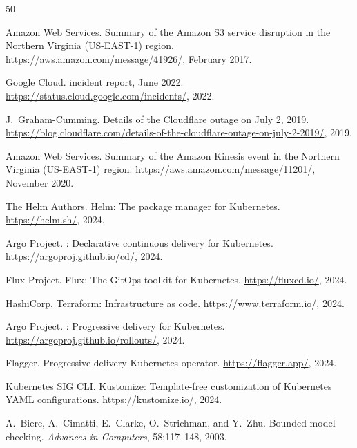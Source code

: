 \documentclass[10pt,twocolumn]{article}
\begin{document}
\begin{thebibliography}{50}

Amazon Web Services.
\newblock Summary of the {Amazon S3} service disruption in the {Northern Virginia (US-EAST-1)} region.
\newblock \url{https://aws.amazon.com/message/41926/}, February 2017.

Google Cloud.
 incident report, June 2022.
\newblock \url{https://status.cloud.google.com/incidents/}, 2022.

J.~Graham-Cumming.
\newblock Details of the {Cloudflare} outage on {July 2, 2019}.
\newblock \url{https://blog.cloudflare.com/details-of-the-cloudflare-outage-on-july-2-2019/}, 2019.

Amazon Web Services.
\newblock Summary of the {Amazon Kinesis} event in the {Northern Virginia (US-EAST-1)} region.
\newblock \url{https://aws.amazon.com/message/11201/}, November 2020.

{The Helm Authors}.
\newblock Helm: The package manager for {Kubernetes}.
\newblock \url{https://helm.sh/}, 2024.

{Argo Project}.
: Declarative continuous delivery for {Kubernetes}.
\newblock \url{https://argoproj.github.io/cd/}, 2024.

{Flux Project}.
\newblock Flux: The {GitOps} toolkit for {Kubernetes}.
\newblock \url{https://fluxcd.io/}, 2024.

{HashiCorp}.
\newblock Terraform: Infrastructure as code.
\newblock \url{https://www.terraform.io/}, 2024.

{Argo Project}.
: Progressive delivery for {Kubernetes}.
\newblock \url{https://argoproj.github.io/rollouts/}, 2024.

{Flagger}.
\newblock Progressive delivery {Kubernetes} operator.
\newblock \url{https://flagger.app/}, 2024.

{Kubernetes SIG CLI}.
\newblock Kustomize: Template-free customization of {Kubernetes} {YAML} configurations.
\newblock \url{https://kustomize.io/}, 2024.

A.~Biere, A.~Cimatti, E.~Clarke, O.~Strichman, and Y.~Zhu.
\newblock Bounded model checking.
\newblock \emph{Advances in Computers}, 58:117--148, 2003.


\end{thebibliography}
\end{document}
